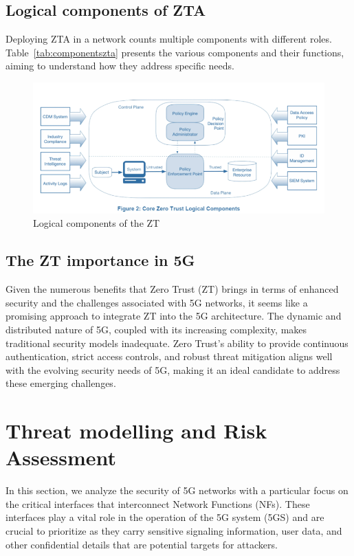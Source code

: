 \documentclass{report}
\begin{document}
\subsection{Logical components of ZTA}
Deploying ZTA in a network counts multiple components with different roles. Table~\ref{tab:componentszta} presents the various components and their functions, aiming to understand how they address specific needs.
\begin{figure}[H]
    \centering
    \includegraphics[width=0.65\linewidth]{figures/ZT components.png}
    \caption{Logical components of the ZT\cite{stafford2020zero}}
    \label{fig:enter-label}
\end{figure}

\subsection{The ZT importance in 5G}
Given the numerous benefits that Zero Trust (ZT) brings in terms of enhanced security and the challenges associated with 5G networks, it seems like a promising approach to integrate ZT into the 5G architecture. The dynamic and distributed nature of 5G, coupled with its increasing complexity, makes traditional security models inadequate. Zero Trust's ability to provide continuous authentication, strict access controls, and robust threat mitigation aligns well with the evolving security needs of 5G, making it an ideal candidate to address these emerging challenges.




\section{Threat modelling and Risk Assessment}
In this section, we analyze the security of 5G networks with a particular focus on the critical interfaces that interconnect Network Functions (NFs). These interfaces play a vital role in the operation of the 5G system (5GS) and are crucial to prioritize as they carry sensitive signaling information, user data, and other confidential details that are potential targets for attackers.
\end{document}
